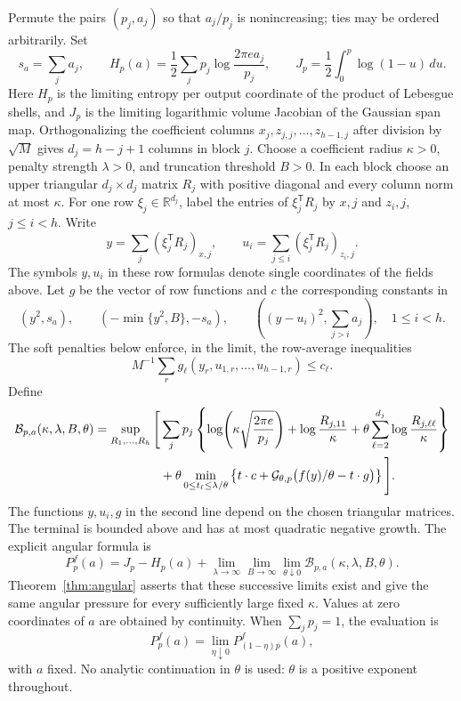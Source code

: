 \documentclass[11pt]{article}
\numberwithin{equation}{section}
\theoremstyle{definition}
\newcommand{\R}{\mathbb R}
\newcommand{\Gauss}{\mathcal G}
\begin{document}
Permute the pairs $(p_j,a_j)$ so that $a_j/p_j$ is nonincreasing; ties may be ordered arbitrarily. Set
\begin{equation}\label{eq:HJ}
s_a=\sum_j a_j,\qquad
H_p(a)=\frac12\sum_jp_j\log\frac{2\pi e a_j}{p_j},\qquad
J_p=\frac12\int_0^p\log(1-u)\,du.
\end{equation}
Here $H_p$ is the limiting entropy per output coordinate of the product of Lebesgue shells, and $J_p$ is the limiting logarithmic volume Jacobian of the Gaussian span map.
Orthogonalizing the coefficient columns $x_j,z_{j,j},\ldots,z_{h-1,j}$ after division by $\sqrt M$ gives $d_j=h-j+1$ columns in block $j$. Choose a coefficient radius $\kappa>0$, penalty strength $\lambda>0$, and truncation threshold $B>0$. In each block choose an upper triangular $d_j\times d_j$ matrix $R_j$ with positive diagonal and every column norm at most $\kappa$. For one row $\xi_j\in\R^{d_j}$, label the entries of $\xi_j^{\mathsf T}R_j$ by $x,j$ and $z_i,j$, $j\le i<h$. Write
\[
y=\sum_j (\xi_j^{\mathsf T}R_j)_{x,j},
\qquad u_i=\sum_{j\le i}(\xi_j^{\mathsf T}R_j)_{z_i,j}.
\]
The symbols $y,u_i$ in these row formulas denote single coordinates of the fields above. Let $g$ be the vector of row functions and $c$ the corresponding constants in
\begin{equation}\label{eq:tests}
(y^2,s_a),\qquad(-\min\{y^2,B\},-s_a),\qquad
\left((y-u_i)^2,\sum_{j>i}a_j\right),\quad 1\le i<h.
\end{equation}
The soft penalties below enforce, in the limit, the row-average inequalities
\[
M^{-1}\sum_r g_\ell(y_r,u_{1,r},\ldots,u_{h-1,r})\le c_\ell.
\]
Define
\begin{align}\label{eq:Bfunctional}
\mathcal B_{p,a}(\kappa,\lambda,B,\theta)
=\sup_{R_1,\ldots,R_h}\Bigg[&
\sum_jp_j\left\{
\log\!\left(\kappa\sqrt{\frac{2\pi e}{p_j}}\right)
+\log\frac{R_{j,11}}\kappa
+\theta\sum_{\ell=2}^{d_j}\log\frac{R_{j,\ell\ell}}\kappa
\right\}\notag\\
&+\theta\min_{0\le t_\ell\le\lambda/\theta}
\left\{t\cdot c+\Gauss_{\theta,p}\big(f(y)/\theta-t\cdot g\big)\right\}\Bigg].
\end{align}
The functions $y,u_i,g$ in the second line depend on the chosen triangular matrices. The terminal is bounded above and has at most quadratic negative growth. The explicit angular formula is
\begin{equation}\label{eq:angularformula}
P_p^f(a)=J_p-H_p(a)+
\lim_{\lambda\to\infty}\lim_{B\to\infty}\lim_{\theta\downarrow0}
\mathcal B_{p,a}(\kappa,\lambda,B,\theta).
\end{equation}
Theorem~\ref{thm:angular} asserts that these successive limits exist and give the same angular pressure for every sufficiently large fixed $\kappa$. Values at zero coordinates of $a$ are obtained by continuity. When $\sum_jp_j=1$, the evaluation is
\begin{equation}\label{eq:pone}
P_p^f(a)=\lim_{\eta\downarrow0}P_{(1-\eta)p}^f(a),
\end{equation}
with $a$ fixed. No analytic continuation in $\theta$ is used: $\theta$ is a positive exponent throughout.
\end{document}
